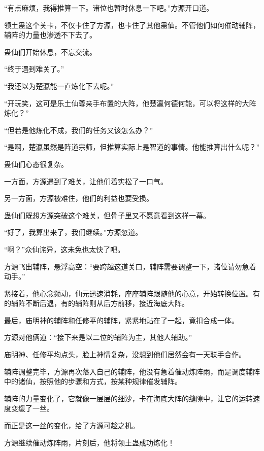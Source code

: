 
\begin{this_body}



“有点麻烦，我得推算一下。诸位也暂时休息一下吧。”方源开口道。

领土蛊这个关卡，不仅卡住了方源，也卡住了其他蛊仙。不管他们如何催动辅阵，辅阵的力量也渗透不下去了。

蛊仙们开始休息，不忘交流。

“终于遇到难关了。”

“我还以为楚瀛能一直炼化下去呢。”

“开玩笑，这可是乐土仙尊亲手布置的大阵，他楚瀛何德何能，可以将这样的大阵炼化？”

“但若是他炼化不成，我们的任务又该怎么办？”

“是啊，楚瀛虽然是阵道宗师，但推算实际上是智道的事情。他能推算出什么呢？”

蛊仙们心态很复杂。

一方面，方源遇到了难关，让他们着实松了一口气。

另一方面，方源被难住，他们的利益也要受损。

蛊仙们既想方源突破这个难关，但骨子里又不愿意看到这样一幕。

“好了，我算出来了，我们继续。”方源忽道。

“啊？”众仙诧异，这未免也太快了吧。

方源飞出辅阵，悬浮高空：“要跨越这道关口，辅阵需要调整一下，诸位请勿急着动手。”

紧接着，他心念频动，仙元迅速消耗，座座辅阵跟随他的心意，开始转换位置。有的辅阵不断后退，有的辅阵则从后方前移，接近海底大阵。

最后，庙明神的辅阵和任修平的辅阵，紧紧地贴在了一起，竟扣合成一体。

方源对他俩道：“接下来是以二位的辅阵为主，其他人辅助。”

庙明神、任修平均点头，脸上神情复杂，没想到他们居然会有一天联手合作。

辅阵调整完毕，方源再次落入自己的辅阵，他没有急着催动炼阵雨，而是调度辅阵中的诸仙，按照他的步骤和方式，按某种规律催发辅阵。

辅阵的力量变化了，它就像一层层的细沙，卡在海底大阵的缝隙中，让它的运转速度变缓了一丝。

而正是这一丝的变化，给了方源可趁之机。

方源继续催动炼阵雨，片刻后，他将领土蛊成功炼化！


\end{this_body}
